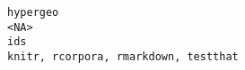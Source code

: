 \documentclass[
  letterpaper,
  DIV=11,
  numbers=noendperiod]{scrreprt}
\begin{document}
\begin{verbatim}
hypergeo                                                                                                                                                                                                                                                                                                                                                                                                                                                                                                                                                                                                                                                                                                                                                                                                                                                                                                                                                                                                                                                                                                                                                                                                                                                                                                 <NA>
ids                                                                                                                                                                                                                                                                                                                                                                                                                                                                                                                                                                                                                                                                                                                                                                                                                                                                                                                                                                                                                                                                                                                                                                                                                                                                      knitr, rcorpora, rmarkdown, testthat

\end{verbatim}
\end{document}

